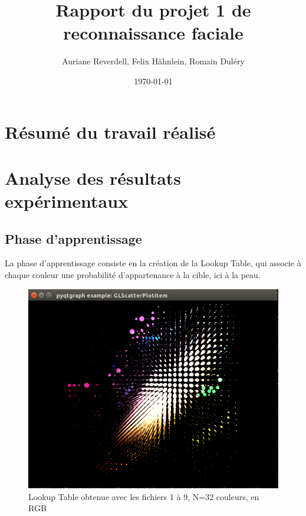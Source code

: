 \documentclass[a4paper,11pt]{article}
\title{Rapport du projet 1 de reconnaissance faciale}
\author{Auriane Reverdell, Felix Hähnlein, Romain Duléry}
\date{\today}
\begin{document}
\maketitle
\vspace{1cm}

\section{Résumé du travail réalisé}
\section{Analyse des résultats expérimentaux}
\subsection{Phase d'apprentissage}

La phase d'apprentissage consiste en la création de la Lookup Table, qui associe à chaque couleur une probabilité d'appartenance à la cible, ici à la peau.

\begin{figure}[H]
\begin{center}
    \includegraphics[scale=0.5]{lT_1_9_8_RGB.png}
    \caption{Lookup Table obtenue avec les fichiers 1 à 9, N=32 couleurs, en RGB}
\end{center}
\end{figure}
\end{document}
